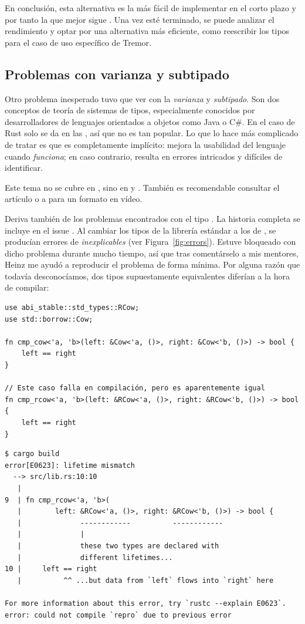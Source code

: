 En conclusión, esta alternativa es la más fácil de implementar en el corto
plazo y por tanto la que mejor sigue \work. Una vez esté terminado, se puede
analizar el rendimiento y optar por una alternativa más eficiente, como
reescribir los tipos para el caso de uso específico de Tremor.

\subsection{Problemas con varianza y subtipado}

Otro problema inesperado tuvo que ver con la \emph{varianza} y \emph{subtipado}.
Son dos conceptos de teoría de sistemas de tipos, especialmente conocidos por
desarrolladores de lenguajes orientados a objetos como Java o C\#. En el caso de
Rust solo se da en las \lifetimes, así que no es tan popular. Lo que lo hace más
complicado de tratar es que es completamente implícito: mejora la usabilidad del
lenguaje cuando \emph{funciona}; en caso contrario, resulta en errores
intricados y difíciles de identificar.

Este tema no se cubre en \textcite{rustbook}, sino en \textcite[Subtyping and
Variance]{nomicon} y \textcite[Subtyping and Variance]{rustref}. También es
recomendable consultar el artículo \textcite{lcnr_covandcontra} o a
\textcite{video_covandcontra} para un formato en vídeo.

Deriva también de los problemas encontrados con el tipo . La
historia completa se incluye en el issue \textcite{abi_covandcontra}. Al cambiar
los tipos de la librería estándar a los de \abistable, se producían errores de
\lifetimes \emph{inexplicables} (ver Figura~\ref{fig:errors}). Estuve bloqueado
con dicho problema durante mucho tiempo, así que tras comentárselo a mis
mentores, Heinz me ayudó a reproducir el problema de forma mínima. Por alguna
razón que todavía desconocíamos, dos tipos supuestamente equivalentes diferían a
la hora de compilar:

\begin{verbatim}
use abi_stable::std_types::RCow;
use std::borrow::Cow;

fn cmp_cow<'a, 'b>(left: &Cow<'a, ()>, right: &Cow<'b, ()>) -> bool {
    left == right
}

// Este caso falla en compilación, pero es aparentemente igual
fn cmp_rcow<'a, 'b>(left: &RCow<'a, ()>, right: &RCow<'b, ()>) -> bool {
    left == right
}
\end{verbatim}

\begin{verbatim}
$ cargo build
error[E0623]: lifetime mismatch
  --> src/lib.rs:10:10
   |
9  | fn cmp_rcow<'a, 'b>(
   |        left: &RCow<'a, ()>, right: &RCow<'b, ()>) -> bool {
   |              ------------          ------------
   |              |
   |              these two types are declared with
   |              different lifetimes...
10 |     left == right
   |          ^^ ...but data from `left` flows into `right` here

For more information about this error, try `rustc --explain E0623`.
error: could not compile `repro` due to previous error
\end{verbatim}

